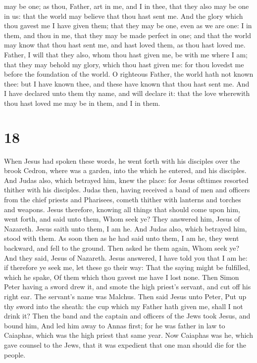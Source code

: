 may be one; as thou, Father, art in me, and I in thee, that they also
may be one in us: that the world may believe that thou hast sent me.
 And the glory which thou gavest me I have given them;
that they may be one, even as we are one:  I in them, and
thou in me, that they may be made perfect in one; and that the world may
know that thou hast sent me, and hast loved them, as thou hast loved me.
 Father, I will that they also, whom thou hast given me,
be with me where I am; that they may behold my glory, which thou hast
given me: for thou lovedst me before the foundation of the world.
 O righteous Father, the world hath not known thee: but I
have known thee, and these have known that thou hast sent me.
 And I have declared unto them thy name, and will declare
it: that the love wherewith thou hast loved me may be in them, and I in
them.

\hypertarget{section-17}{%
\section{18}\label{section-17}}

 When Jesus had spoken these words, he went forth with his
disciples over the brook Cedron, where was a garden, into the which he
entered, and his disciples.  And Judas also, which
betrayed him, knew the place: for Jesus ofttimes resorted thither with
his disciples.  Judas then, having received a band of men
and officers from the chief priests and Pharisees, cometh thither with
lanterns and torches and weapons.  Jesus therefore,
knowing all things that should come upon him, went forth, and said unto
them, Whom seek ye?  They answered him, Jesus of Nazareth.
Jesus saith unto them, I am he. And Judas also, which betrayed him,
stood with them.  As soon then as he had said unto them, I
am he, they went backward, and fell to the ground.  Then
asked he them again, Whom seek ye? And they said, Jesus of Nazareth.
 Jesus answered, I have told you that I am he: if
therefore ye seek me, let these go their way:  That the
saying might be fulfilled, which he spake, Of them which thou gavest me
have I lost none.  Then Simon Peter having a sword drew
it, and smote the high priest's servant, and cut off his right ear. The
servant's name was Malchus.  Then said Jesus unto Peter,
Put up thy sword into the sheath: the cup which my Father hath given me,
shall I not drink it?  Then the band and the captain and
officers of the Jews took Jesus, and bound him,  And led
him away to Annas first; for he was father in law to Caiaphas, which was
the high priest that same year.  Now Caiaphas was he,
which gave counsel to the Jews, that it was expedient that one man
should die for the people.

